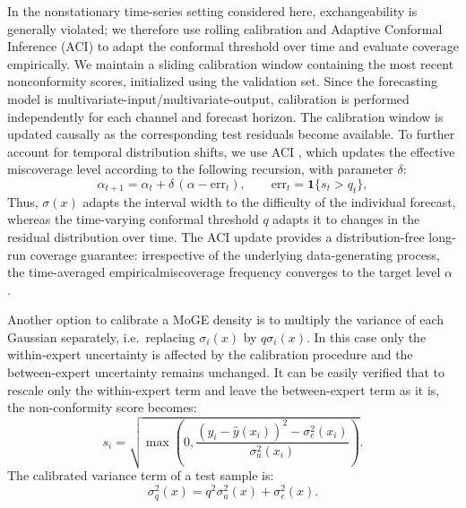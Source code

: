 In the nonstationary time-series setting considered here, exchangeability is generally violated; we therefore use rolling calibration and 
Adaptive Conformal Inference (ACI) \cite{gibbs2021adaptive} to adapt the conformal threshold over time and evaluate coverage empirically.
We maintain a sliding calibration window containing the most recent nonconformity scores, initialized using the validation set. Since the forecasting model is multivariate-input/multivariate-output, calibration is performed independently for each channel and forecast horizon. The calibration window is updated causally as the corresponding test residuals become available. To further account for temporal distribution shifts, we use ACI \cite{gibbs2021adaptive}, which updates the effective miscoverage level according 
to the following recursion, with parameter $\delta$:  
\begin{equation}   \alpha_{t+1} = \alpha_t + \delta\,(\alpha - \mathrm{err}_t),
  \qquad \mathrm{err}_t = \mathbf{1}\{s_t > q_t\},
\end{equation}
Thus, $\sigma(x)$ adapts the interval width to the difficulty of the individual forecast, whereas the time-varying conformal threshold $q$
 adapts it to changes in the residual distribution over time.
 The ACI update provides a distribution-free long-run coverage guarantee: irrespective of the underlying data-generating process, the  time-averaged empiricalmiscoverage frequency converges to the target level $\alpha$ \cite{gibbs2021adaptive}.

Another option to calibrate a MoGE density is to multiply the variance of each Gaussian separately, i.e.\ replacing $\sigma_i(x)$ by $q\sigma_i(x)$.
In this case only the within-expert uncertainty is affected by the calibration procedure and the between-expert uncertainty remains unchanged.
 It can be easily verified that to rescale only the within-expert term and leave the between-expert
term as it is, the non-conformity score becomes:
\begin{equation}
  s_i = \sqrt{\max (0, \frac{(y_i-\hat{y}(x_i))^2 - \sigma_e^2(x_i) }{\sigma_a^2(x_i)})}.
\end{equation}
The calibrated variance term of a test sample is: 
\begin{equation}
\sigma_q^2(x)  = q^2\sigma_a^2(x)+\sigma_e^2(x).
\label{eq:calvar}
\end{equation}

